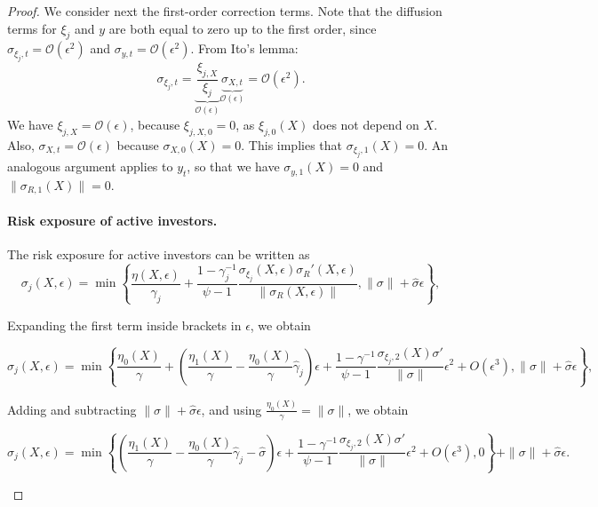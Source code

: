 \begin{proof} We consider next the first-order correction terms. Note that the diffusion terms for $\xi_j$ and $y$ are both equal to zero up to the first order, since $\sigma_{\xi_j,t} = \mathcal{O}(\epsilon^2)$ and $\sigma_{y,t} = \mathcal{O}(\epsilon^2)$. From Ito's lemma:
\begin{equation}
    \sigma_{\xi_j,t} = \underbrace{\frac{\xi_{j,X}}{\xi_j}}_{\mathcal{O}(\epsilon)}\underbrace{ \sigma_{X,t}}_{\mathcal{O}(\epsilon)} = \mathcal{O}(\epsilon^2).
\end{equation}
We have $\xi_{j,X} = \mathcal{O}(\epsilon)$, because $\xi_{j,X,0} = 0$, as $\xi_{j,0}(X)$ does not depend on $X$. Also, $\sigma_{X,t} = \mathcal{O}(\epsilon)$ because $\sigma_{X,0}(X) = 0$. This implies that $ \sigma_{\xi_j,1}(X)=0 $. An analogous argument applies to $y_t$, so that we have $\sigma_{y,1}(X) = 0$ and $\|\sigma_{R,1}(X)\| = 0$. 

\paragraph{Risk exposure of active investors.} The risk exposure for active investors can be written as
\begin{equation}
    \sigma_{j}(X,\epsilon) = \min \left\{ \frac{\eta(X,\epsilon)}{\gamma_j}  + \frac{1-\gamma_j^{-1}}{\psi-1} \frac{\sigma_{\xi_j}(X,\epsilon) \sigma_{R}'(X,\epsilon)}{\|\sigma_{R}(X,\epsilon)\|}, \|\sigma\| + \hat{\sigma} \epsilon \right\},
\end{equation}

Expanding the first term inside brackets in $\epsilon$, we obtain
\begin{small}
	\begin{equation}
		\sigma_{j}(X,\epsilon) = \min \left\{ \frac{\eta_0(X)}{\gamma} + \left(\frac{\eta_1(X)}{\gamma}- \frac{\eta_0(X)}{\gamma} \hat{\gamma}_j \right)\epsilon + \frac{1-\gamma^{-1}}{\psi-1} \frac{\sigma_{\xi_j,2}(X) \sigma'}{\|\sigma\|} \epsilon^2 + O(\epsilon^3)  , \|\sigma\| + \hat{\sigma} \epsilon \right\}, 
	\end{equation}
\end{small}

Adding and subtracting $\|\sigma\| + \hat{\sigma}\epsilon$, and using $\frac{\eta_0(X)}{\gamma} = \|\sigma\|$, we obtain
\begin{small}
	\begin{equation}\label{eq:sigma-j}
		\sigma_{j}(X,\epsilon) = \min \left\{ \left(\frac{\eta_1(X)}{\gamma}- \frac{\eta_0(X)}{\gamma} \hat{\gamma}_j -\hat{\sigma}\right)\epsilon + \frac{1-\gamma^{-1}}{\psi-1} \frac{\sigma_{\xi_j,2}(X) \sigma'}{\|\sigma\|} \epsilon^2 + O(\epsilon^3)  , 0 \right\}+\|\sigma\| + \hat{\sigma} \epsilon.
	\end{equation}
\end{small}


\end{proof}
